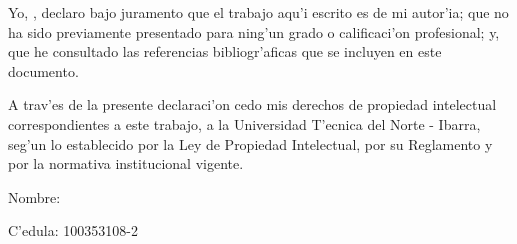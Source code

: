 
Yo, \insertauthor , declaro bajo juramento que el trabajo aqu'i escrito es de mi autor'ia; que no ha sido previamente presentado para ning'un grado o calificaci'on profesional; y, que he consultado las referencias bibliogr'aficas que se incluyen en este documento. 

\vspace{1cm}

A trav'es de la presente declaraci'on cedo mis derechos de propiedad intelectual correspondientes a este trabajo, a la Universidad T'ecnica del Norte - Ibarra, seg'un lo establecido por la Ley de Propiedad Intelectual, por su Reglamento y por la normativa institucional vigente. 


\vspace{5.5cm}

\begin{flushright}
Nombre: \insertauthor
\end{flushright}
\begin{flushright}
C'edula: 100353108-2
\end{flushright}